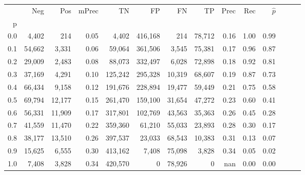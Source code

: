 \begin{tabular}{rrrrrrrrrrrrrr}
\toprule
{} &     Neg &     Pos & mPrec &       TN &       FP &      FN &      TP &  Prec &   Rec & $\hat{p}$ \\
p   &         &         &       &          &          &         &         &       &       &           \\
\midrule
0.0 &   4,402 &     214 &  0.05 &    4,402 &  416,168 &     214 &  78,712 &  0.16 &  1.00 &      0.99 \\
0.1 &  54,662 &   3,331 &  0.06 &   59,064 &  361,506 &   3,545 &  75,381 &  0.17 &  0.96 &      0.87 \\
0.2 &  29,009 &   2,483 &  0.08 &   88,073 &  332,497 &   6,028 &  72,898 &  0.18 &  0.92 &      0.81 \\
0.3 &  37,169 &   4,291 &  0.10 &  125,242 &  295,328 &  10,319 &  68,607 &  0.19 &  0.87 &      0.73 \\
0.4 &  66,434 &   9,158 &  0.12 &  191,676 &  228,894 &  19,477 &  59,449 &  0.21 &  0.75 &      0.58 \\
0.5 &  69,794 &  12,177 &  0.15 &  261,470 &  159,100 &  31,654 &  47,272 &  0.23 &  0.60 &      0.41 \\
0.6 &  56,331 &  11,909 &  0.17 &  317,801 &  102,769 &  43,563 &  35,363 &  0.26 &  0.45 &      0.28 \\
0.7 &  41,559 &  11,470 &  0.22 &  359,360 &   61,210 &  55,033 &  23,893 &  0.28 &  0.30 &      0.17 \\
0.8 &  38,177 &  13,510 &  0.26 &  397,537 &   23,033 &  68,543 &  10,383 &  0.31 &  0.13 &      0.07 \\
0.9 &  15,625 &   6,555 &  0.30 &  413,162 &    7,408 &  75,098 &   3,828 &  0.34 &  0.05 &      0.02 \\
1.0 &   7,408 &   3,828 &  0.34 &  420,570 &        0 &  78,926 &       0 &   nan &  0.00 &      0.00 \\
\bottomrule
\end{tabular}
